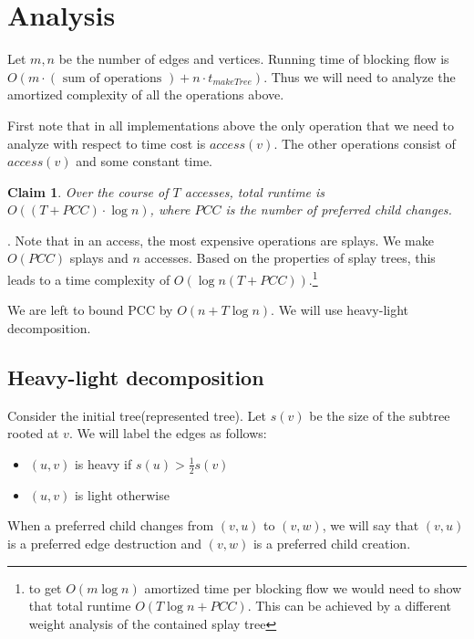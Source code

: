 \documentclass[11pt]{article}
\newtheorem{claim}{Claim}
\begin{document}
\section{Analysis}

Let $m,n$ be the number of edges and vertices. Running time of blocking flow is $O(m\cdot (\text{ sum of operations })+ n\cdot t_{makeTree} )$. Thus we will need to analyze the amortized complexity of all the operations above.

First note that in all implementations above the only operation that we need to analyze with respect to time cost is $access(v)$. The other operations consist of $access(v)$ and some constant time. 

\begin{claim}
Over the course of $T$ accesses, total runtime is $O((T+PCC)\cdot \log n)$, where $PCC$ is the number of preferred child changes.
\end{claim}

. Note that in an access, the most expensive operations are splays. We make $O(PCC)$ splays and $n$ accesses. Based on the properties of splay trees, this leads to a time complexity of $O(\log n(T+PCC))$.\footnote{to get $O(m\log n)$ amortized time per blocking flow we would need to show that total runtime $O(T\log n+PCC)$. This can be achieved by a different weight analysis of the contained splay tree}

We are left to bound PCC by $O(n+T\log n)$. We will use heavy-light decomposition.

\subsection{Heavy-light decomposition}

Consider the initial tree(represented tree). Let $s(v)$ be the size of the subtree rooted at $v$. We will label the edges as follows:

\begin{itemize}
	\item $(u,v)$ is heavy if $s(u)>\frac{1}{2}s(v)$
	\item $(u,v)$ is light otherwise
	
\end{itemize}

When a preferred child changes from $(v,u)$ to $(v,w)$, we will say that $(v,u)$ is a preferred edge destruction and $(v,w)$ is a preferred child creation.

\smallskip
\end{document}
